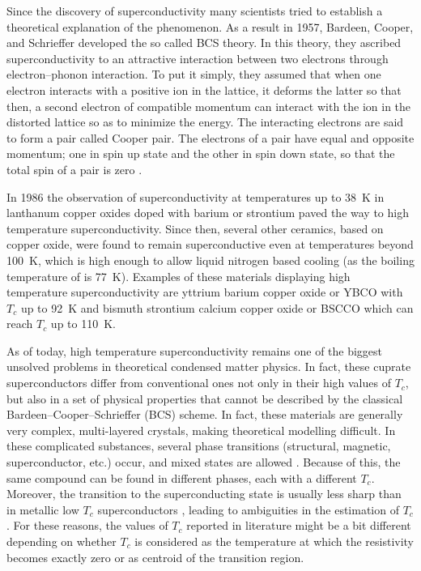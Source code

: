 \documentclass[rmp,10pt,onecolumn,fleqn,notitlepage]{revtex4-1}
\begin{document}
Since the discovery of superconductivity many scientists tried to establish a theoretical explanation of the phenomenon. As a result in 1957, Bardeen, Cooper, and Schrieffer developed the so called BCS theory. In this theory, they ascribed superconductivity to an attractive interaction between two electrons through electron–phonon interaction. To put it simply, they assumed that when one electron interacts with a positive ion in the lattice, it deforms the latter so that then, a second electron of compatible momentum can interact with the ion in the distorted lattice so as to minimize the energy. The interacting electrons are said to form a pair called Cooper pair. The electrons of a pair have equal and opposite momentum; one in spin up state and the other in spin down state, so that the total spin of a pair is zero \cite{BCSth}.

In 1986 the observation of superconductivity at temperatures up to \SI{38}{\kelvin} in lanthanum copper oxides doped with barium or strontium  \cite{bednorz1986possible} paved the way to high temperature superconductivity. Since then, several other ceramics, based on copper oxide, were found to remain superconductive even at temperatures beyond \SI{100}{\kelvin}, which is high enough to allow liquid nitrogen based cooling (as the boiling temperature of  is \SI{77}{\kelvin}). 
Examples of these materials displaying high temperature superconductivity are yttrium barium copper oxide or YBCO with $T_c$ up to \SI{92}{\kelvin} and bismuth strontium calcium copper oxide or BSCCO which can reach $T_c$ up to \SI{110}{\kelvin}. 

As of today, high temperature superconductivity remains one of the biggest unsolved problems in theoretical condensed matter physics. In fact, these cuprate superconductors differ from conventional ones not only in their high values of $T_c$, but also in a set of physical properties that cannot be described by the classical Bardeen–Cooper–Schrieffer (BCS) scheme.
In fact, these materials are generally very complex, multi-layered crystals, making theoretical modelling difficult. In these complicated substances, several phase transitions (structural, magnetic, superconductor, etc.) occur, and mixed states are allowed \cite{cuprate_review}. Because of this, the same compound can be found in different phases, each with a different $T_c$. Moreover, the transition to the superconducting state is usually less sharp than in metallic low $T_c$ superconductors \cite{HTC_springer}, leading to ambiguities in the estimation of $T_c$. For these reasons, the values of $T_c$ reported in literature might be a bit different depending on whether $T_c$ is considered as the temperature at which the resistivity becomes exactly zero or as centroid of the transition region. 
\end{document}
